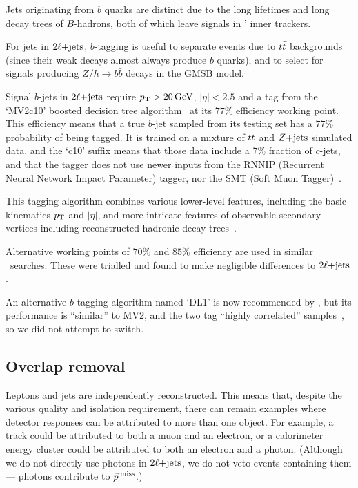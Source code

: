Jets originating from $b$ quarks are distinct due to the long lifetimes and
long decay trees of $B$-hadrons, both of which leave signals in \atlas'
inner trackers.

For jets in $\twoljets$, $b$-tagging is useful to separate events due to
$\ttbar$ backgrounds (since their weak decays almost always produce $b$
quarks), and to select for signals producing $Z/h \rightarrow b\bar b$ decays
in the GMSB model.

Signal $b$-jets in $\twoljets$ require $\pt > 20\,\eV[G]$, $|\eta| < 2.5$ and a
tag from the `MV2c10' boosted decision tree
algorithm~\cite{
friedman2002stochastic,
atlas_jet_mv2c10_2017,
atlas_jet_tagging_2019
} at its $77\%$ efficiency working point.
This efficiency means that a true $b$-jet sampled from its testing set has a
$77\%$ probability of being tagged.
It is trained on a mixture of $\ttbar$ and $\zjets$ simulated data,
and the `c10' suffix means that those data include a $7\%$ fraction of
$c$-jets, and that the tagger does not use newer inputs from the
RNNIP (Recurrent Neural Network Impact Parameter) tagger, nor the
SMT (Soft Muon Tagger)~\cite{atlas_twiki_mv2, atlas_jet_mv2c10_2017}.

This tagging algorithm combines various lower-level features, including the
basic kinematics $\pt$ and $|\eta|$, and more intricate features of
observable secondary vertices including reconstructed hadronic decay
trees~\cite{atlas_jet_mv2c10_2017}.

Alternative working points of $70\%$ and $85\%$ efficiency are used in similar
\atlas\ searches.
These were trialled and found to make negligible differences to $\twoljets$.

An alternative $b$-tagging algorithm named `DL1' is now recommended by \atlas,
but its performance is ``similar'' to MV2, and the two tag
``highly correlated'' samples~\cite{atlas_jet_tagging_2019}, so we did not
attempt to switch.


\subsection{Overlap removal}
\label{sec:2ljets_overlap_removal}
Leptons and jets are independently reconstructed.
This means that, despite the various quality and isolation requirement, there
can remain examples where detector responses can be attributed to more than
one object.
For example, a track could be attributed to both a muon and an electron,
or a calorimeter energy cluster could be attributed to both an electron and a
photon. (Although we do not directly use photons in $\twoljets$, we do not veto
events containing them --- photons contribute to $\ptmiss$.)


